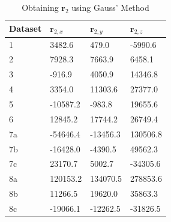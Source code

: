 \documentclass[12pt, letterpaper]{aiaa-tc}
\begin{document}
\begin{enumerate}
    \begin{table}[]
        \centering
        \begin{tabular}{|l|lll|}
        \hline
        Dataset & $\bm{r}_{2,x}$                & $\bm{r}_{2,y}$                & $\bm{r}_{2,z}$          \\ \hline
        1       & \multicolumn{1}{l|}{3482.6}   & \multicolumn{1}{l|}{479.0}    & -5990.6  \\ \hline
        2       & \multicolumn{1}{l|}{7928.3}   & \multicolumn{1}{l|}{7663.9}   & 6458.1   \\ \hline
        3       & \multicolumn{1}{l|}{-916.9}   & \multicolumn{1}{l|}{4050.9}   & 14346.8  \\ \hline
        4       & \multicolumn{1}{l|}{3354.0}   & \multicolumn{1}{l|}{11303.6}  & 27377.0  \\ \hline
        5       & \multicolumn{1}{l|}{-10587.2} & \multicolumn{1}{l|}{-983.8}   & 19655.6  \\ \hline
        6       & \multicolumn{1}{l|}{12845.2}  & \multicolumn{1}{l|}{17744.2}  & 26749.4  \\ \hline
        7a      & \multicolumn{1}{l|}{-54646.4} & \multicolumn{1}{l|}{-13456.3} & 130506.8 \\ \hline
        7b      & \multicolumn{1}{l|}{-16428.0} & \multicolumn{1}{l|}{-4390.5}  & 49562.3  \\ \hline
        7c      & \multicolumn{1}{l|}{23170.7}  & \multicolumn{1}{l|}{5002.7}   & -34305.6 \\ \hline
        8a      & \multicolumn{1}{l|}{120153.2} & \multicolumn{1}{l|}{134070.5} & 278853.6 \\ \hline
        8b      & \multicolumn{1}{l|}{11266.5}  & \multicolumn{1}{l|}{19620.0}  & 35863.3  \\ \hline
        8c      & \multicolumn{1}{l|}{-19066.1} & \multicolumn{1}{l|}{-12262.5} & -31826.5 \\ \hline
        \end{tabular}
        \label{g_m_2}
        \caption{Obtaining $\bm{r}_{2}$ using Gauss' Method}
    \end{table}


\end{enumerate}
\end{document}
